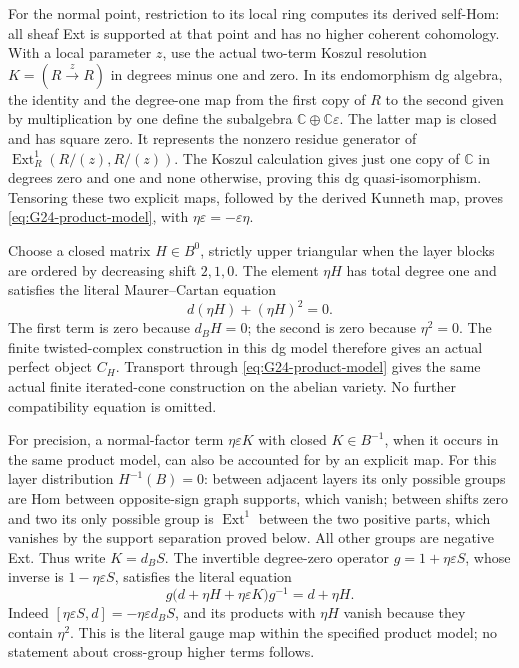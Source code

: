 For the normal point, restriction to its local ring computes its
derived self-Hom: all sheaf Ext is supported at that point and has
no higher coherent cohomology. With a local parameter \(z\), use
the actual two-term Koszul resolution \(K=(R\xrightarrow{z}R)\)
in degrees minus one and zero. In its endomorphism dg algebra,
the identity and the degree-one map from the first copy of \(R\)
to the second given by multiplication by one define the subalgebra
\(\mathbb C\oplus\mathbb C\varepsilon\). The latter map is
closed and has square zero. It represents the nonzero residue
generator of \(\operatorname{Ext}^1_R(R/(z),R/(z))\).
The Koszul calculation gives just one copy of \(\mathbb C\)
in degrees zero and one and none otherwise, proving this dg
quasi-isomorphism. Tensoring these two explicit maps, followed by
the derived Kunneth map, proves \eqref{eq:G24-product-model},
with \(\eta\varepsilon=-\varepsilon\eta\).

Choose a closed matrix \(H\in B^0\), strictly upper triangular
when the layer blocks are ordered by decreasing shift \(2,1,0\).
The element \(\eta H\) has total degree one and satisfies the
literal Maurer--Cartan equation
\[
                  d(\eta H)+(\eta H)^2=0.
\]
The first term is zero because \(d_BH=0\); the second is zero
because \(\eta^2=0\). The finite twisted-complex construction
in this dg model therefore gives an actual perfect object \(C_H\).
Transport through \eqref{eq:G24-product-model} gives the same
actual finite iterated-cone construction on the abelian variety.
No further compatibility equation is omitted.

For precision, a normal-factor term \(\eta\varepsilon K\)
with closed \(K\in B^{-1}\), when it occurs in the same product
model, can also be accounted for by an explicit map. For this layer
distribution \(H^{-1}(B)=0\): between adjacent layers its only
possible groups are Hom between opposite-sign graph supports,
which vanish; between shifts zero and two its only possible group
is \(\operatorname{Ext}^1\) between the two positive parts, which
vanishes by the support separation proved below. All other groups
are negative Ext. Thus write \(K=d_BS\). The invertible degree-zero
operator \(g=1+\eta\varepsilon S\), whose inverse is
\(1-\eta\varepsilon S\), satisfies the literal equation
\[
 g\bigl(d+\eta H+\eta\varepsilon K\bigr)g^{-1}=d+\eta H.
\]
Indeed \([\eta\varepsilon S,d]=-\eta\varepsilon d_BS\),
and its products with \(\eta H\) vanish because they contain
\(\eta^2\). This is the literal gauge map within the specified
product model; no statement about cross-group higher terms follows.

